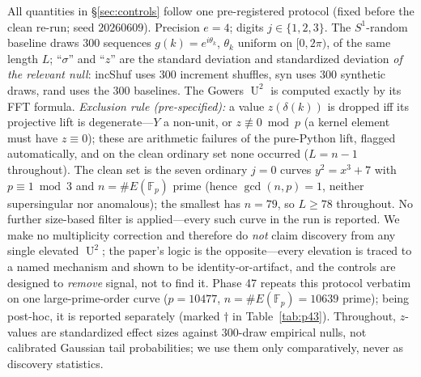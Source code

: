 \documentclass[11pt]{article}
\theoremstyle{definition}
\newcommand{\Fp}{\mathbb{F}_p}
\DeclareMathOperator{\Uk}{U}
\begin{document}
All quantities in \S\ref{sec:controls} follow one pre-registered protocol
(fixed before the clean re-run; seed $20260609$). Precision $e=4$; digits
$j\in\{1,2,3\}$. The $S^1$-random baseline draws $300$ sequences
$g(k)=e^{i\theta_k}$, $\theta_k$ uniform on $[0,2\pi)$, of the same length
$L$; ``$\sigma$'' and ``$z$'' are the standard deviation and standardized
deviation \emph{of the relevant null}: incShuf uses $300$ increment
shuffles, syn uses $300$ synthetic draws, rand uses the $300$ baselines.
The Gowers $\Uk^2$ is computed exactly by its FFT formula. \emph{Exclusion
rule (pre-specified):} a value $z(\delta(k))$ is dropped iff its
projective lift is degenerate---$Y$ a non-unit, or $z\not\equiv 0\bmod p$
(a kernel element must have $z\equiv 0$); these are arithmetic failures of
the pure-Python lift, flagged automatically, and on the clean ordinary set
none occurred ($L=n-1$ throughout). The clean set is the seven ordinary
$j{=}0$ curves $y^2=x^3+7$ with $p\equiv 1\bmod 3$ and $n=\#E(\Fp)$ prime
(hence $\gcd(n,p)=1$, neither supersingular nor anomalous); the smallest
has $n=79$, so $L\ge 78$ throughout. No further size-based filter is
applied---every such curve in the run is reported.
We make no multiplicity correction and therefore do \emph{not} claim
discovery from any single elevated $\Uk^2$; the paper's logic is the
opposite---every elevation is traced to a named mechanism and shown to be
identity-or-artifact, and the controls are designed to \emph{remove}
signal, not to find it. Phase 47 repeats this protocol verbatim on one
large-prime-order curve ($p=10477$, $n=\#E(\Fp)=10639$ prime); being
post-hoc, it is reported separately (marked $\dagger$ in
Table~\ref{tab:p43}). Throughout, $z$-values are standardized effect
sizes against $300$-draw empirical nulls, not calibrated Gaussian tail
probabilities; we use them only comparatively, never as discovery
statistics.
\end{document}
